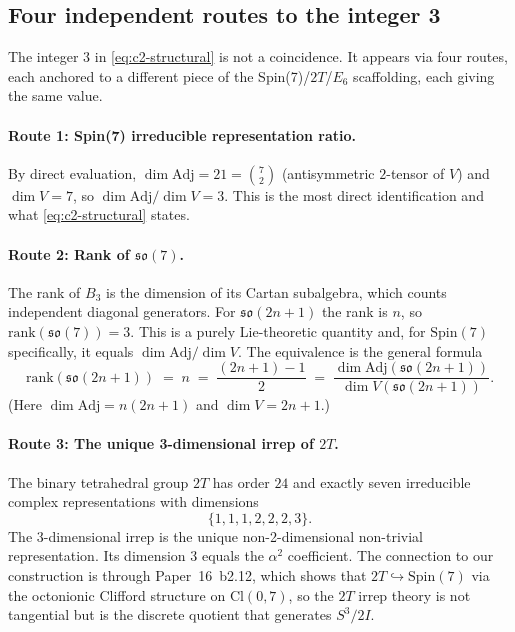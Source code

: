 \documentclass[11pt]{article}
\newcommand{\so}{\mathfrak{so}}
\newcommand{\Spin}{\mathrm{Spin}}
\newcommand{\Adj}{\mathrm{Adj}}
\begin{document}
\subsection{Four independent routes to the integer 3}
\label{sec:alpha-squared-four-routes}

The integer $3$ in \eqref{eq:c2-structural} is not a coincidence.
It appears via four routes, each anchored to a different piece of
the Spin(7)/$2T$/$E_6$ scaffolding, each giving the same value.

\paragraph{Route 1: Spin(7) irreducible representation ratio.}
By direct evaluation,
$\dim \Adj = 21 = \binom{7}{2}$ (antisymmetric $2$-tensor of $V$)
and $\dim V = 7$, so $\dim \Adj / \dim V = 3$.  This is the most
direct identification and what \eqref{eq:c2-structural} states.

\paragraph{Route 2: Rank of $\so(7)$.}
The rank of $B_3$ is the dimension of its Cartan subalgebra, which
counts independent diagonal generators.  For
$\so(2n+1)$ the rank is $n$, so $\mathrm{rank}(\so(7)) = 3$.
This is a purely Lie-theoretic quantity and, for $\Spin(7)$
specifically, it equals $\dim \Adj / \dim V$.  The equivalence is
the general formula
\begin{equation}
  \mathrm{rank}(\so(2n+1))
  \;=\; n
  \;=\; \frac{(2n+1) - 1}{2}
  \;=\; \frac{\dim \Adj(\so(2n+1))}{\dim V(\so(2n+1))}.
\end{equation}
(Here $\dim \Adj = n(2n+1)$ and $\dim V = 2n+1$.)

\paragraph{Route 3: The unique 3-dimensional irrep of $2T$.}
The binary tetrahedral group $2T$ has order $24$ and exactly
seven irreducible complex representations with dimensions
\begin{equation}
  \{1, 1, 1, 2, 2, 2, 3\}.
\end{equation}
The $3$-dimensional irrep is the unique non-2-dimensional
non-trivial representation.  Its dimension $3$ equals the
$\alpha^2$ coefficient.  The connection to our construction is
through Paper~16~b2.12, which shows that
$2T \hookrightarrow \Spin(7)$ via the octonionic Clifford
structure on $\mathrm{Cl}(0,7)$, so the $2T$ irrep theory is not
tangential but is the discrete quotient that generates $S^3/2I$.
\end{document}
